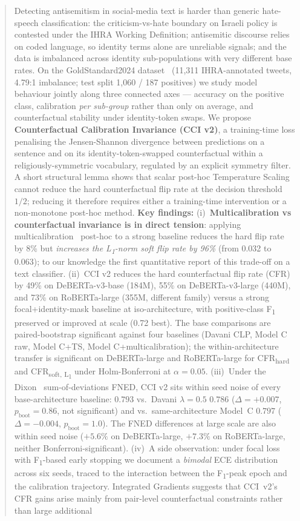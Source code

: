 \begin{abstract}
Detecting antisemitism in social-media text is harder than generic hate-speech classification: the criticism-vs-hate boundary on Israeli policy is contested under the IHRA Working Definition; antisemitic discourse relies on coded language, so identity terms alone are unreliable signals; and the data is imbalanced across identity sub-populations with very different base rates. On the GoldStandard2024 dataset~\citep{jikeli2024goldstandard} (11{,}311 IHRA-annotated tweets, 4.79:1 imbalance; test split 1{,}060 / 187 positives) we study model behaviour jointly along three connected axes --- accuracy on the positive class, calibration \emph{per sub-group} rather than only on average, and counterfactual stability under identity-token swaps. We propose \textbf{Counterfactual Calibration Invariance (CCI v2)}, a training-time loss penalising the Jensen-Shannon divergence between predictions on a sentence and on its identity-token-swapped counterfactual within a religiously-symmetric vocabulary, regulated by an explicit symmetry filter. A short structural lemma shows that scalar post-hoc Temperature Scaling cannot reduce the hard counterfactual flip rate at the decision threshold $1/2$; reducing it therefore requires either a training-time intervention or a non-monotone post-hoc method. \textbf{Key findings:} (i)~\textbf{Multicalibration vs counterfactual invariance is in direct tension}: applying multicalibration~\citep{hebertjohnson2018multicalibration} post-hoc to a strong baseline reduces the hard flip rate by 8\% but \emph{increases the L\textsubscript{1}-norm soft flip rate by 96\%} (from 0.032 to 0.063); to our knowledge the first quantitative report of this trade-off on a text classifier. (ii)~CCI v2 reduces the hard counterfactual flip rate (CFR) by 49\% on DeBERTa-v3-base (184M), 55\% on DeBERTa-v3-large (440M), and 73\% on RoBERTa-large (355M, different family) versus a strong focal+identity-mask baseline at iso-architecture, with positive-class F\textsubscript{1} preserved or improved at scale (0.72 best). The base comparisons are paired-bootstrap significant against four baselines (Davani CLP, Model C raw, Model C+TS, Model C+multicalibration); the within-architecture transfer is significant on DeBERTa-large and RoBERTa-large for CFR\textsubscript{hard} and CFR\textsubscript{soft, L\textsubscript{1}} under Holm-Bonferroni at $\alpha = 0.05$. (iii)~Under the Dixon~\citep{dixon2018measuring} sum-of-deviations FNED, CCI v2 sits within seed noise of every base-architecture baseline: $0.793$ vs.\ Davani $\lambda=0.5$ $0.786$ ($\Delta=+0.007$, $p_{\text{boot}}=0.86$, not significant) and vs.\ same-architecture Model~C $0.797$ ($\Delta=-0.004$, $p_{\text{boot}}=1.0$). The FNED differences at large scale are also within seed noise ($+5.6\%$ on DeBERTa-large, $+7.3\%$ on RoBERTa-large, neither Bonferroni-significant). (iv)~A side observation: under focal loss with F\textsubscript{1}-based early stopping we document a \emph{bimodal} ECE distribution across six seeds, traced to the interaction between the F\textsubscript{1}-peak epoch and the calibration trajectory. Integrated Gradients suggests that CCI~v2's CFR gains arise mainly from pair-level counterfactual constraints rather than large additional 
\end{abstract}
